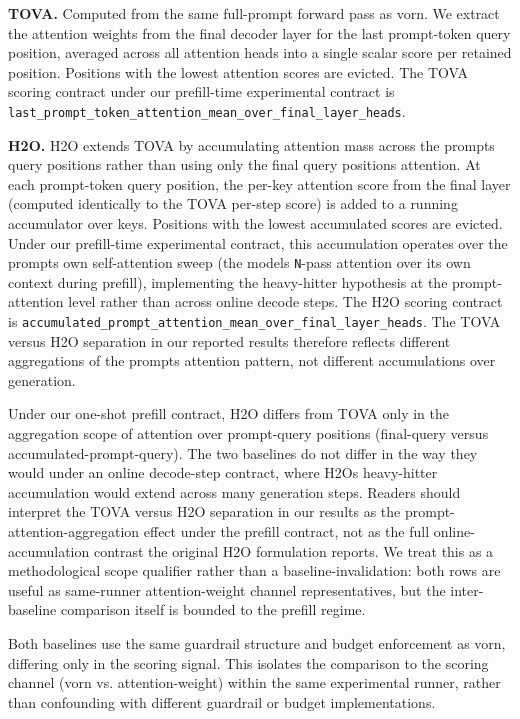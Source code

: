 \documentclass[
]{article}
\begin{document}
\textbf{TOVA.} Computed from the same full-prompt forward pass as
vorn. We extract the attention weights from the final decoder layer for
the last prompt-token query position, averaged across all attention
heads into a single scalar score per retained position. Positions with
the lowest attention scores are evicted. The TOVA scoring contract
under our prefill-time experimental contract is
\texttt{last\_prompt\_token\_attention\_mean\_over\_final\_layer\_heads}.

\textbf{H2O.} H2O extends TOVA by accumulating
attention mass across the prompt\textquotesingle s query positions
rather than using only the final query position\textquotesingle s
attention. At each prompt-token query position, the per-key attention
score from the final layer (computed identically to the TOVA
per-step score) is added to a running accumulator over keys. Positions
with the lowest accumulated scores are evicted. Under our prefill-time
experimental contract, this accumulation operates over the
prompt\textquotesingle s own self-attention sweep (the
model\textquotesingle s \texttt{N}-pass attention over its own context
during prefill), implementing the heavy-hitter hypothesis at the
prompt-attention level rather than across online decode steps. The
H2O scoring contract is
\texttt{accumulated\_prompt\_attention\_mean\_over\_final\_layer\_heads}.
The TOVA versus H2O separation in our reported results
therefore reflects different aggregations of the
prompt\textquotesingle s attention pattern, not different accumulations
over generation.

Under our one-shot prefill contract, H2O differs from TOVA
only in the aggregation scope of attention over prompt-query positions
(final-query versus accumulated-prompt-query). The two baselines do not
differ in the way they would under an online decode-step contract, where
H2O\textquotesingle s heavy-hitter accumulation would extend across many
generation steps. Readers should interpret the TOVA versus
H2O separation in our results as the prompt-attention-aggregation
effect under the prefill contract, not as the full online-accumulation
contrast the original H2O formulation reports. We treat this as a
methodological scope qualifier rather than a baseline-invalidation: both
rows are useful as same-runner attention-weight channel representatives,
but the inter-baseline comparison itself is bounded to the prefill
regime.

Both baselines use the same guardrail structure and budget enforcement
as vorn, differing only in the scoring signal. This isolates the
comparison to the scoring channel (vorn vs.
attention-weight) within the same experimental runner, rather than
confounding with different guardrail or budget implementations.
\end{document}
